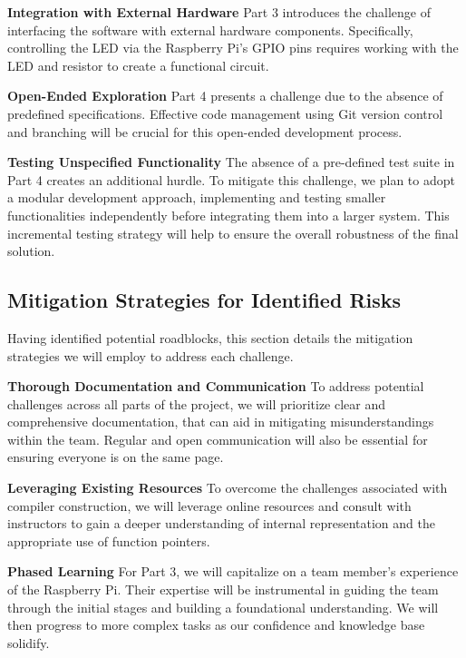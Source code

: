 \documentclass[9pt,a4paper,twoside]{tau-class/tau}
\begin{document}
        \textbf{Integration with External Hardware }
        Part 3 introduces the challenge of interfacing the software with external hardware components. Specifically, controlling the LED via the Raspberry Pi's GPIO pins requires working with the LED and resistor to create a functional circuit. 
        
        \textbf{Open-Ended Exploration }
        Part 4 presents a challenge due to the absence of predefined specifications. Effective code management using Git version control and branching will be crucial for this open-ended development process.
        
        \textbf{Testing Unspecified Functionality }
        The absence of a pre-defined test suite in Part 4 creates an additional hurdle. To mitigate this challenge, we plan to adopt a modular development approach, implementing and testing smaller functionalities independently before integrating them into a larger system. This incremental testing strategy will help to ensure the overall robustness of the final solution.
        
    \subsection{Mitigation Strategies for Identified Risks}
        Having identified potential roadblocks, this section details the mitigation strategies we will employ to address each challenge.
        
        \textbf{Thorough Documentation and Communication}
        To address potential challenges across all parts of the project, we will prioritize clear and comprehensive documentation, that can aid in mitigating misunderstandings within the team. Regular and open communication will also be essential for ensuring everyone is on the same page.  
        
        \textbf{Leveraging Existing Resources}
        To overcome the challenges associated with compiler construction, we will leverage online resources and consult with instructors to gain a deeper understanding of internal representation and the appropriate use of function pointers.  
        
        \textbf{Phased Learning}
        For Part 3, we will capitalize on a team member's experience of the Raspberry Pi. Their expertise will be instrumental in guiding the team through the initial stages and building a foundational understanding. We will then progress to more complex tasks as our confidence and knowledge base solidify.  
        
\end{document}
